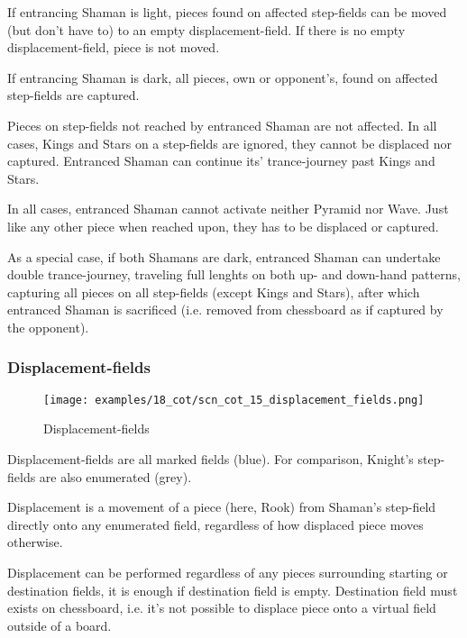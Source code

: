 If entrancing Shaman is light, pieces found on affected step-fields can be moved
(but don't have to) to an empty displacement-field. If there is no empty
displacement-field, piece is not moved.

If entrancing Shaman is dark, all pieces, own or opponent's, found on affected
step-fields are captured.

Pieces on step-fields not reached by entranced Shaman are not affected. In all
cases, Kings and Stars on a step-fields are ignored, they cannot be displaced
nor captured. Entranced Shaman can continue its' trance-journey past Kings and Stars.

In all cases, entranced Shaman cannot activate neither Pyramid nor Wave.
Just like any other piece when reached upon, they has to be displaced or captured.

As a special case, if both Shamans are dark, entranced Shaman can undertake double
trance-journey, traveling full lenghts on both up- and down-hand patterns, capturing
all pieces on all step-fields (except Kings and Stars), after which entranced Shaman
is sacrificed (i.e. removed from chessboard as if captured by the opponent).

\clearpage %

\subsubsection*{Displacement-fields}

\noindent
\begin{figure}[!h]
\texttt{[image: examples/18\_cot/scn\_cot\_15\_displacement\_fields.png]}
\caption{Displacement-fields}
\label{fig:scn_cot_15_displacement_fields}
\end{figure}

Displacement-fields are all marked fields (blue). For comparison, Knight's
step-fields are also enumerated (grey).

Displacement is a movement of a piece (here, Rook) from Shaman's step-field directly
onto any enumerated field, regardless of how displaced piece moves otherwise.

Displacement can be performed regardless of any pieces surrounding starting or
destination fields, it is enough if destination field is empty. Destination field
must exists on chessboard, i.e. it's not possible to displace piece onto a virtual
field outside of a board.

